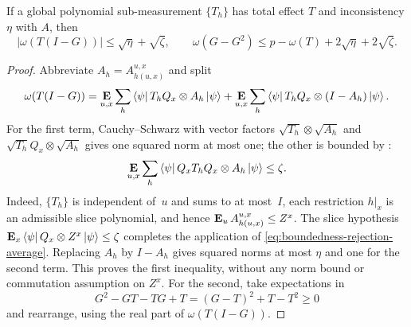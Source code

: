 \documentclass[11pt]{article}
\theoremstyle{definition}
\newcommand{\E}{\mathop{\bf E\/}}
\begin{document}
\begin{lemma}\label{lem:pasting-second-moment}
If a global polynomial sub-measurement $\{T_h\}$ has total effect $T$
and inconsistency $\eta$ with $A$, then
\begin{equation}\label{eq:pasting-support}
 |\omega(T(I-G))|\leq\sqrt\eta+\sqrt\zeta,\qquad
 \omega(G-G^2)\leq p-\omega(T)+2\sqrt\eta+2\sqrt\zeta.
\end{equation}
\end{lemma}
\begin{proof}
Abbreviate $A_h=A^{u,x}_{h(u,x)}$ and split
\[
 \omega(T(I-G))=\E_{u,x}\sum_h\bra\psi T_hQ_x\otimes A_h\ket\psi
       +\E_{u,x}\sum_h\bra\psi T_hQ_x\otimes(I-A_h)\ket\psi.
\]
For the first term, Cauchy--Schwarz with vector factors
$\sqrt{T_h}\otimes\sqrt{A_h}$ and
$\sqrt{T_h}Q_x\otimes\sqrt{A_h}$ gives one squared norm at most one;
the other is bounded by :
\[
 \E_{u,x}\sum_h\bra\psi Q_xT_hQ_x\otimes A_h\ket\psi
 \leq\zeta.
\]
Indeed, $\{T_h\}$ is independent of~$u$ and sums to at most~$I$,
each restriction $h|_x$ is an admissible slice polynomial, and hence
$\E_u A^{u,x}_{h(u,x)}\leq Z^x$.  The slice hypothesis
$\E_x\bra\psi Q_x\otimes Z^x\ket\psi\leq\zeta$ completes the
application of \eqref{eq:boundedness-rejection-average}.
Replacing $A_h$ by $I-A_h$ gives squared
norms at most $\eta$ and one for the second term.  This proves the
first inequality, without any norm bound or commutation assumption
on $Z^x$.  For the second, take expectations in
\[
 G^2-GT-TG+T=(G-T)^2+T-T^2\geq0
\]
and rearrange, using the real part of $\omega(T(I-G))$.
\end{proof}
\end{document}

